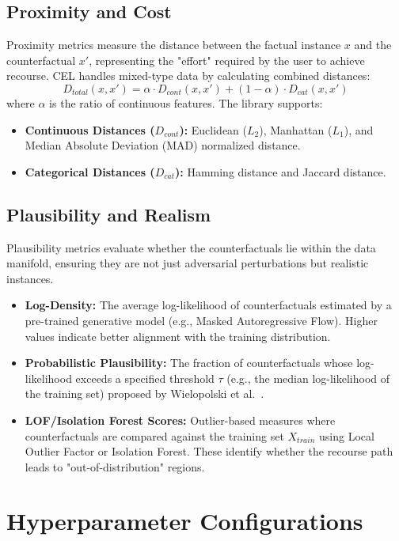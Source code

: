 \documentclass[runningheads]{llncs}
\begin{document}
\subsection{Proximity and Cost}
Proximity metrics measure the distance between the factual instance $x$ and the counterfactual $x'$, representing the "effort" required by the user to achieve recourse. CEL handles mixed-type data by calculating combined distances:
\begin{equation}
    D_{total}(x, x') = \alpha \cdot D_{cont}(x, x') + (1 - \alpha) \cdot D_{cat}(x, x')
\end{equation}
where $\alpha$ is the ratio of continuous features. The library supports:
\begin{itemize}
    \item \textbf{Continuous Distances ($D_{cont}$):} Euclidean ($L_2$), Manhattan ($L_1$), and Median Absolute Deviation (MAD) normalized distance.
    \item \textbf{Categorical Distances ($D_{cat}$):} Hamming distance and Jaccard distance.
\end{itemize}
\subsection{Plausibility and Realism}
Plausibility metrics evaluate whether the counterfactuals lie within the data manifold, ensuring they are not just adversarial perturbations but realistic instances.
\begin{itemize}
    \item \textbf{Log-Density:} The average log-likelihood of counterfactuals estimated by a pre-trained generative model (e.g., Masked Autoregressive Flow). Higher values indicate better alignment with the training distribution.
    \item \textbf{Probabilistic Plausibility:} The fraction of counterfactuals whose log-likelihood exceeds a specified threshold $\tau$ (e.g., the median log-likelihood of the training set) proposed by Wielopolski et al.~\cite{wielopolski2024probabilistically}.
    \item \textbf{LOF/Isolation Forest Scores:} Outlier-based measures where counterfactuals are compared against the training set $X_{train}$ using Local Outlier Factor or Isolation Forest. These identify whether the recourse path leads to "out-of-distribution" regions.
\end{itemize}


\section{Hyperparameter Configurations}
\label{app:hyperparameters}
\end{document}
